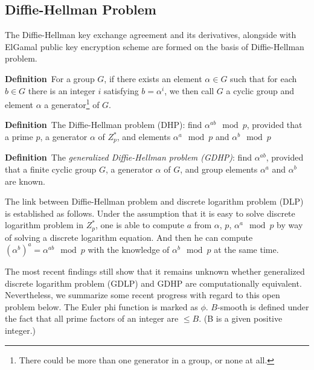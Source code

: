 \documentclass[12pt,journal,compsoc]{IEEEtran}
\begin{document}
\subsection{Diffie-Hellman Problem}
The Diffie-Hellman key exchange agreement and its derivatives,
alongside with ElGamal public key encryption scheme are formed on the
basis of Diffie-Hellman problem. 
\par
\textbf{Definition}~For a group $G$, if there exists an element
$\alpha\in G$ such that for each $b\in G$ there is an integer $i$
satisfying $b=\alpha^{i}$, we then call $G$ a cyclic group and element
$\alpha$ a generator\footnote{There could be more than one generator
  in a group, or none at all.} of $G$.\label{sec:diff-hellm-probl}
\par
\textbf{Definition}~The Diffie-Hellman problem (DHP): find
$\alpha^{ab}\mod p$, provided that a prime
$p$, a generator $\alpha$ of $Z^{*}_{p}$, and elements
$\alpha^{a}\mod p$ and $\alpha^{b}\mod p$
\par
\textbf{Definition}~The \emph{generalized Diffie-Hellman problem
  (GDHP)}: find $\alpha^{ab}$, provided that a finite cyclic group
$G$, a generator $\alpha$ of $G$, and group elements $\alpha^{a}$ and
$\alpha^{b}$ are known. 
\par
The link between Diffie-Hellman problem and discrete logarithm problem
(DLP) is established as follows. Under the assumption that it is easy
to solve discrete logarithm problem in $Z^{*}_{p}$, one is able to
compute $a$ from $\alpha$, $p$, $\alpha^{a}\mod p$ by way of solving a
discrete logarithm equation. And then he can compute
${(\alpha^{b})}^{a}=\alpha^{ab}\mod p$ with the knowledge of
$\alpha^{b}\mod p$ at the same time.
\par
The most recent findings still show that it remains unknown whether
generalized discrete logarithm problem (GDLP) and GDHP are
computationally equivalent. Nevertheless, we summarize some recent
progress with regard to this open problem below. The Euler phi
function is marked as $\phi$. $B$-smooth is defined under the fact
that all prime factors of an integer are $\leq B$. (B is a given
positive integer.)
\end{document}
